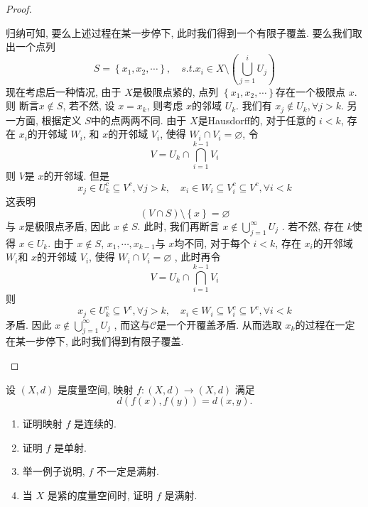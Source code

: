 \documentclass[../main.tex]{subfiles}
\begin{document}
\begin{proof}
\begin{enumerate}
        归纳可知, 要么上述过程在某一步停下, 此时我们得到一个有限子覆盖. 要么我们取出一个点列 \[
      S=   \left\{ x_1,x_2,\cdots  \right\}, \quad s.t. x_{i}\in X\setminus \left( \bigcup _{j= 1}^{i}U_{j} \right) 
        \]现在考虑后一种情况, 由于 \(  X  \)是极限点紧的, 点列 \(  \left\{ x_1,x_2,\cdots  \right\}  \)存在一个极限点 \(  x  \). 则 断言\(  x\not \in S  \), 若不然, 设 \(  x= x_{k}  \), 则考虑 \(  x  \)的邻域 \(  U_{k}  \). 我们有 \(  x_{j}\not \in U_{k}, \forall j> k  \). 另一方面, 根据定义 \(  S  \)中的点两两不同. 由于 \(  X  \)是Hausdorff的, 对于任意的 \(  i< k  \), 存在 \(  x_{i}  \)的开邻域 \(  W_{i}  \), 和 \(  x  \)的开邻域 \(  V_{i}  \), 使得 \(  W_{i}\cap V_{i}= \varnothing  \), 令 \[
        V= U_{k}\cap  \bigcap _{i= 1}^{k-1}V_{i}
        \]     则 \(  V  \)是 \(  x  \)的开邻域. 但是 \[
        x_{j}\in U_{k}^{c}\subseteq V^{c}, \forall j> k,\quad  x_{i}\in W_{i}\subseteq V_{i}^{c}\subseteq V^{c}, \forall i< k
        \]这表明 \[
        \left( V\cap S \right)\setminus \left\{ x\right\}= \varnothing 
        \]     与 \(  x  \)是极限点矛盾, 因此 \(  x\not \in S  \).       此时, 我们再断言 \(  x\not \in  \bigcup _{j= 1}^{\infty}U_{j}  \) . 若不然, 存在 \(  k  \)使得 \(  x \in U_{k}  \). 由于 \(  x\not \in S  \), \(  x_1,\cdots ,x_{k-1}  \)与   \(  x  \)均不同, 对于每个 \(  i< k  \), 存在 \(  x_{i}  \)的开邻域 \(  W_{i}  \)和 \(  x  \)的开邻域 \(  V_{i}  \), 使得 \(  W_{i}\cap V_{i}= \varnothing  \)       , 此时再令 \[
        V= U_{k}\cap \bigcap _{i= 1}^{k-1}V_{i}
        \]则\[
        x_{j}\in U_{k}^{c}\subseteq V^{c}, \forall j> k,\quad  x_{i}\in W_{i}\subseteq V_{i}^{c}\subseteq V^{c}, \forall i< k
        \]矛盾. 因此 \(  x \not \in \bigcup _{j= 1}^{\infty}U_{j}  \) , 而这与\(  \mathcal{C}  \)是一个开覆盖矛盾. 从而选取 \(  x_{k}  \)的过程在一定在某一步停下, 此时我们得到有限子覆盖. 
    \end{enumerate}
    
\end{proof}
\begin{exercise}{}{}
设 $(X, d)$ 是度量空间, 映射 $f : (X, d) \to (X, d)$ 满足
\[d(f(x), f(y)) = d(x, y).\]
\begin{enumerate}
\item 证明映射 $f$ 是连续的.
\item 证明 $f$ 是单射.
\item 举一例子说明, $f$ 不一定是满射.
\item 当 $X$ 是紧的度量空间时, 证明 $f$ 是满射.
\end{enumerate}
\end{exercise}
\end{document}
